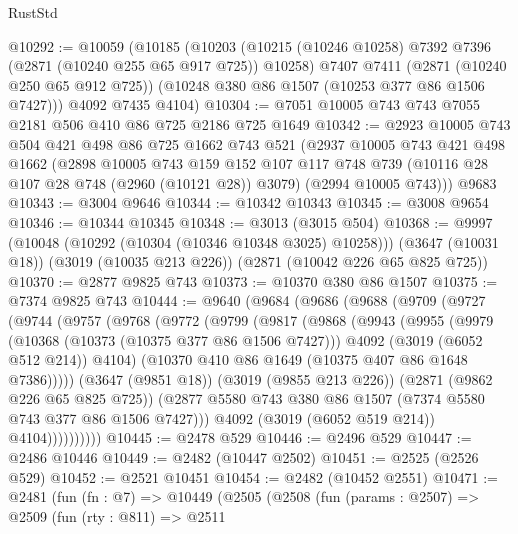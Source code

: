 \begin{lexlean}{RustStd}
\begin{coremodule}
@10292 := @10059
    (@10185
      (@10203
        (@10215 (@10246 @10258) @7392 @7396 (@2871 (@10240 @255 @65 @917 @725)) @10258)
        @7407
        @7411
        (@2871 (@10240 @250 @65 @912 @725))
        (@10248 @380 @86 @1507 (@10253 @377 @86 @1506 @7427)))
      @4092
      @7435
      @4104)
@10304 := @7051 @10005 @743 @743 @7055 @2181 @506 @410 @86 @725 @2186 @725 @1649
@10342 := @2923
    @10005
    @743
    @504
    @421
    @498
    @86
    @725
    @1662
    @743
    @521
    (@2937
      @10005
      @743
      @421
      @498
      @1662
      (@2898
        @10005
        @743
        @159
        @152
        @107
        @117
        @748
        @739
        (@10116 @28 @107 @28 @748 (@2960 (@10121 @28)) @3079)
        (@2994 @10005 @743)))
    @9683
@10343 := @3004 @9646
@10344 := @10342 @10343
@10345 := @3008 @9654
@10346 := @10344 @10345
@10348 := @3013 (@3015 @504)
@10368 := @9997
    (@10048 (@10292 (@10304 (@10346 @10348 @3025) @10258)))
    (@3647 (@10031 @18))
    (@3019 (@10035 @213 @226))
    (@2871 (@10042 @226 @65 @825 @725))
@10370 := @2877 @9825 @743
@10373 := @10370 @380 @86 @1507
@10375 := @7374 @9825 @743
@10444 := @9640
    (@9684
      (@9686
        (@9688
          (@9709
            (@9727
              (@9744
                (@9757
                  (@9768
                    (@9772
                      (@9799
                        (@9817
                          (@9868
                            (@9943
                              (@9955
                                (@9979
                                  (@10368 (@10373 (@10375 @377 @86 @1506 @7427)))
                                  @4092
                                  (@3019 (@6052 @512 @214))
                                  @4104)
                                (@10370 @410 @86 @1649 (@10375 @407 @86 @1648 @7386)))))
                          (@3647 (@9851 @18))
                          (@3019 (@9855 @213 @226))
                          (@2871 (@9862 @226 @65 @825 @725))
                          (@2877 @5580 @743 @380 @86 @1507 (@7374 @5580 @743 @377 @86 @1506 @7427)))
                        @4092
                        (@3019 (@6052 @519 @214))
                        @4104))))))))))
@10445 := @2478 @529
@10446 := @2496 @529
@10447 := @2486 @10446
@10449 := @2482 (@10447 @2502)
@10451 := @2525 (@2526 @529)
@10452 := @2521 @10451
@10454 := @2482 (@10452 @2551)
@10471 := @2481
    (fun (fn : @7) =>
    @10449
      (@2505
        (@2508
          (fun (params : @2507) =>
          @2509
            (fun (rty : @811) =>
            @2511

\end{coremodule}
\end{lexlean}
